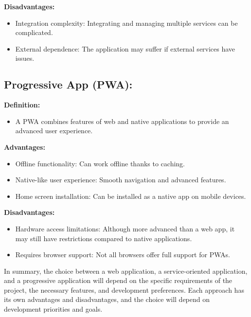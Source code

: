 \documentclass{article}
\begin{document}
\textbf{Disadvantages:}
\begin{itemize}
  \item Integration complexity: Integrating and managing multiple services can be complicated.
  \item External dependence: The application may suffer if external services have issues.
\end{itemize}

\subsection*{Progressive App (PWA):}

\textbf{Definition:}
\begin{itemize}
  \item A PWA combines features of web and native applications to provide an advanced user experience.
\end{itemize}

\textbf{Advantages:}
\begin{itemize}
  \item Offline functionality: Can work offline thanks to caching.
  \item Native-like user experience: Smooth navigation and advanced features.
  \item Home screen installation: Can be installed as a native app on mobile devices.
\end{itemize}

\textbf{Disadvantages:}
\begin{itemize}
  \item Hardware access limitations: Although more advanced than a web app, it may still have restrictions compared to native applications.
  \item Requires browser support: Not all browsers offer full support for PWAs.
\end{itemize}

In summary, the choice between a web application, a service-oriented application, and a progressive application will depend on the specific requirements of the project, the necessary features, and development preferences. Each approach has its own advantages and disadvantages, and the choice will depend on development priorities and goals.
\pagebreak

\citep{latexproject,latexproject2,latexproject3,latexproject4}
\end{document}
